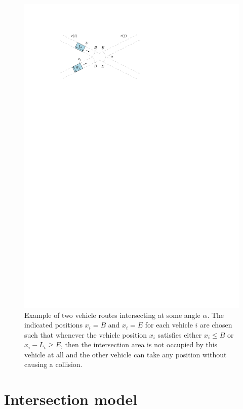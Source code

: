 \documentclass[a4paper]{report}
\theoremstyle{definition}
\theoremstyle{plain}
\begin{document}
\begin{figure}
  \centering
  \includegraphics[scale=1]{figures/intersection-non-axis-aligned-annotated}
  \caption{Example of two vehicle routes intersecting at some angle $\alpha$. The
    indicated positions $x_{i} = B$ and $x_{i} = E$ for each vehicle $i$ are
    chosen such that whenever the vehicle position $x_{i}$ satisfies either
    $x_{i} \leq B$ or $x_{i} - L_{i} \geq E$, then the intersection area is not
    occupied by this vehicle at all and the other vehicle can take any position
    without causing a collision.}%
  \label{fig:intersection-non-axis-aligned}
\end{figure}


\section{Intersection model}\label{sec:intersection-model}
\end{document}

